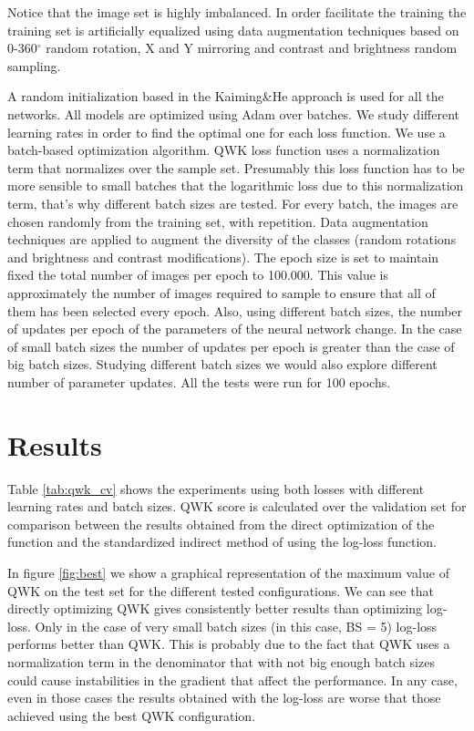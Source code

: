 \documentclass[times,twocolumn,final,authoryear]{elsarticle}
\newcommand{\degree}{\ensuremath{^{\circ}}\xspace} %
\begin{document}
Notice that the image set is highly imbalanced. In order facilitate the training the training set is artificially equalized using data augmentation techniques based on 0-360\degree random rotation, X and Y mirroring and contrast and brightness random sampling.

A random initialization based in the Kaiming\&He approach \citep{kaiming} is used for all the networks. All models are optimized using Adam \citep{DBLP:journals/corr/KingmaB14} over batches. We study different learning rates in order to find the optimal one for each loss function. We use a batch-based optimization algorithm. QWK loss function uses a normalization term that normalizes over the sample set. Presumably this loss function has to be more sensible to small batches that the logarithmic loss due to this normalization term, that's why different batch sizes are tested. For every batch, the images are chosen randomly from the training set, with repetition. Data augmentation techniques are applied to augment the diversity of the classes (random rotations and brightness and contrast modifications). The epoch size is set to maintain fixed the total number of images per epoch to 100.000. This value is approximately the number of images required to sample to ensure that all of them has been selected every epoch. Also, using different batch sizes, the number of updates per epoch of the parameters of the neural network change. In the case of small batch sizes the number of updates per epoch is greater than the case of big batch sizes. Studying different batch sizes we would also explore different number of parameter updates. All the tests were run for 100 epochs.

\section{Results}

Table \ref{tab:qwk_cv} shows the experiments using both losses with different learning rates and batch sizes. QWK score is calculated over the validation set for comparison between the results obtained from the direct optimization of the function and the standardized indirect method of using the log-loss function. 

In figure \ref{fig:best} we show a graphical representation of the maximum value of QWK on the test set for the different tested configurations. We can see that directly optimizing QWK gives consistently better results than optimizing log-loss. Only in the case of very small batch sizes (in this case, BS = 5) log-loss performs better than QWK. This is probably due to the fact that QWK uses a normalization term in the denominator that with not big enough batch sizes could cause instabilities in the gradient that affect the performance. In any case, even in those cases the results obtained with the log-loss are worse that those achieved using the best QWK configuration.
\end{document}
